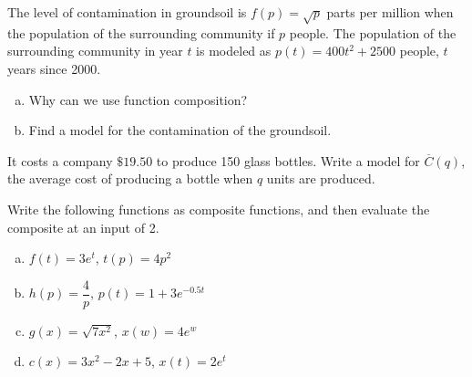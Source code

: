 \documentclass[notes]{subfiles}
\begin{document}
		\begin{ex}
			The level of contamination in groundsoil is $f(p) = \sqrt{p}$ parts per million when the population of the surrounding community if $p$ people.  The population of the surrounding community in year $t$ is modeled as $p(t) = 400t^2+2500$ people, $t$ years since 2000.
			\begin{enumerate}[(a)]
				\item Why can we use function composition?
					
				\item Find a model for the contamination of the groundsoil.
					
			\end{enumerate}
		\end{ex}
			
			
		\begin{ex}
			It costs a company $\$19.50$ to produce 150 glass bottles.  Write a model for $\overline{C}(q)$, the average cost of producing a bottle when $q$ units are produced.
		\end{ex}
			\vs{1.5}
			\newpage
			
		\begin{ex}
			Write the following functions as composite functions, and then evaluate the composite at an input of 2.
			\begin{enumerate}[(a)]
				\item $f(t) = 3e^t$, $t(p) = 4p^2$
					\vs{1}
					
				\item $h(p) = \dfrac{4}{p}$, $p(t) = 1 + 3e^{-0.5t}$
					\vs{1}
					
				\item $g(x) = \sqrt{7x^2}$, $x(w) = 4e^w$
					\vs{1}
					
				\item $c(x) = 3x^2-2x+5$, $x(t) = 2e^t$
					\vs{1}
					
			\end{enumerate}
		\end{ex}
	\clearpage
\end{document}
